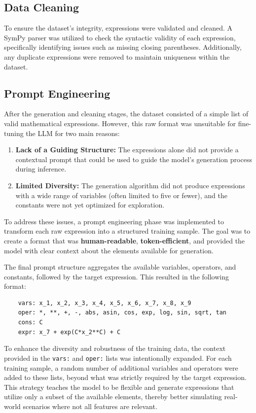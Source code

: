         \subsection{Data Cleaning}
            To ensure the dataset's integrity, expressions were validated and cleaned. A SymPy \cite{sympy} parser was utilized to check the syntactic validity of each expression, specifically identifying issues such as missing closing parentheses. Additionally, any duplicate expressions were removed to maintain uniqueness within the dataset.
        
    \subsection{Prompt Engineering}
    \label{sec:prompt_engineering}
    
    After the generation and cleaning stages, the dataset consisted of a simple list of valid mathematical expressions. However, this raw format was unsuitable for fine-tuning the LLM for two main reasons:
    \begin{enumerate}
        \item \textbf{Lack of a Guiding Structure:} The expressions alone did not provide a contextual prompt that could be used to guide the model's generation process during inference.
        \item \textbf{Limited Diversity:} The generation algorithm did not produce expressions with a wide range of variables (often limited to five or fewer), and the constants were not yet optimized for exploration.
    \end{enumerate}
    
    To address these issues, a prompt engineering phase was implemented to transform each raw expression into a structured training sample. The goal was to create a format that was \textbf{human-readable}, \textbf{token-efficient}, and provided the model with clear context about the elements available for generation.
    
    The final prompt structure aggregates the available variables, operators, and constants, followed by the target expression. This resulted in the following format:
    \begin{verbatim}
    vars: x_1, x_2, x_3, x_4, x_5, x_6, x_7, x_8, x_9
    oper: *, **, +, -, abs, asin, cos, exp, log, sin, sqrt, tan
    cons: C
    expr: x_7 + exp(C*x_2**C) + C
    \end{verbatim}
    
    To enhance the diversity and robustness of the training data, the context provided in the \texttt{vars:} and \texttt{oper:} lists was intentionally expanded. For each training sample, a random number of additional variables and operators were added to these lists, beyond what was strictly required by the target expression. This strategy teaches the model to be flexible and generate expressions that utilize only a subset of the available elements, thereby better simulating real-world scenarios where not all features are relevant.
    
